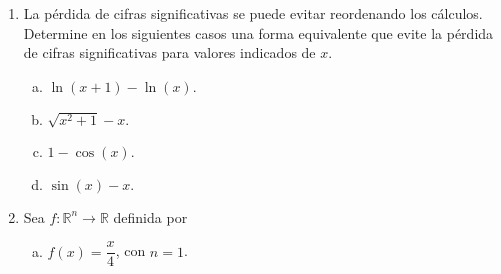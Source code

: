 \documentclass[
	spanish,
	8pt,
	utf8,
	xcolor=table,
	handout,
	aspectratio=169,
	professionalfonts,
	notheorems,
	mathserif,
]{beamer}
\begin{document}
\begin{frame}
\begin{enumerate}
		\item

		      La pérdida de cifras significativas se puede evitar
		      reordenando los cálculos.
		      Determine en los siguientes casos una forma equivalente que
		      evite la pérdida de cifras significativas para valores
		      indicados de $x$.

		      \begin{multicols}{4}
			      \begin{enumerate}[a)]

				      \item

				            \begin{math}
					            \ln\left(x+1\right)-\ln\left(x\right).
				            \end{math}

				      \item

				            \begin{math}
					            \sqrt{x^{2}+1}-x.
				            \end{math}


				      \item

				            \begin{math}
					            1-\cos\left(x\right).
				            \end{math}

				      \item

				            \begin{math}
					            \sin\left(x\right)-x.
				            \end{math}
			      \end{enumerate}
		      \end{multicols}

		\item

		      Sea $f\colon\mathbb{R}^{n}\to\mathbb{R}$ definida por

		      \begin{multicols}{3}
			      \begin{enumerate}[a)]

				      \item

				            \begin{math}
					            f\left(x\right)=
					            \dfrac{x}{4}
				            \end{math},
				            con $n=1$.


\end{enumerate}
\end{multicols}
\end{enumerate}
\end{frame}
\end{document}
